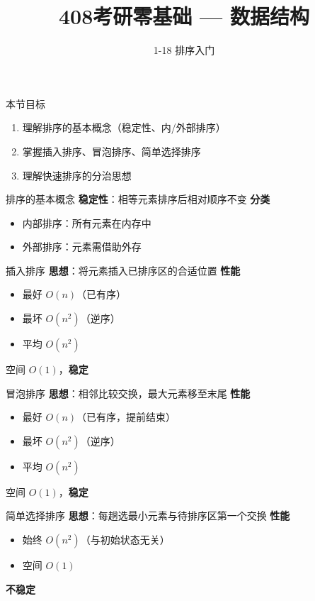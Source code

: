 \documentclass[10pt, aspectratio=169]{beamer}
\title{408考研零基础 --- 数据结构}
\subtitle{1-18 排序入门}
\author{}
\date{}
\begin{document}
\begin{frame}{本节目标}
\begin{enumerate}
\item 理解排序的基本概念（稳定性、内/外部排序）
\item 掌握插入排序、冒泡排序、简单选择排序
\item 理解快速排序的分治思想
\end{enumerate}
\end{frame}
\begin{frame}{排序的基本概念}
\textbf{稳定性}：相等元素排序后相对顺序不变
\vspace{0.3em}
\textbf{分类}
\begin{itemize}
\item 内部排序：所有元素在内存中
\item 外部排序：元素需借助外存
\end{itemize}
\end{frame}
\begin{frame}{插入排序}
\textbf{思想}：将元素插入已排序区的合适位置
\vspace{0.3em}
\textbf{性能}
\begin{itemize}
\item 最好 $O(n)$（已有序）
\item 最坏 $O(n^2)$（逆序）
\item 平均 $O(n^2)$
\end{itemize}
\vspace{0.3em}
空间 $O(1)$，\textbf{稳定}
\end{frame}
\begin{frame}{冒泡排序}
\textbf{思想}：相邻比较交换，最大元素移至末尾
\vspace{0.3em}
\textbf{性能}
\begin{itemize}
\item 最好 $O(n)$（已有序，提前结束）
\item 最坏 $O(n^2)$（逆序）
\item 平均 $O(n^2)$
\end{itemize}
\vspace{0.3em}
空间 $O(1)$，\textbf{稳定}
\end{frame}
\begin{frame}{简单选择排序}
\textbf{思想}：每趟选最小元素与待排序区第一个交换
\vspace{0.3em}
\textbf{性能}
\begin{itemize}
\item 始终 $O(n^2)$（与初始状态无关）
\item 空间 $O(1)$
\end{itemize}
\textbf{不稳定}
\end{frame}
\end{document}
